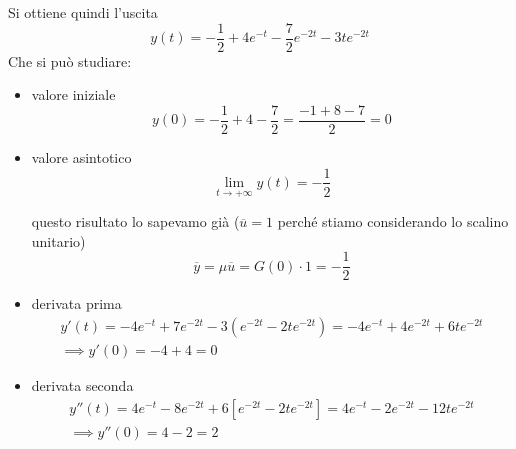 Si ottiene quindi l'uscita
\begin{equation*}
	y(t)=-\frac{1}{2} +4e^{-t} -\frac{7}{2} e^{-2t} -3te^{-2t}
\end{equation*}
Che si può studiare:
\begin{itemize}
	\item valore iniziale\begin{equation*}
	      y(0) =-\frac{1}{2} +4-\frac{7}{2} =\frac{-1+8-7}{2} =0
	\end{equation*}
	\item valore asintotico\begin{equation*}
	      \lim _{t\to +\infty } y(t) =-\frac{1}{2}
	\end{equation*}
	
	questo risultato lo sapevamo già ($\overline{u} =1$ perché stiamo considerando lo scalino unitario)\begin{equation*}
	\overline{y} =\mu \overline{u} =G(0) \cdotp 1=-\frac{1}{2}
	\end{equation*}
	\item derivata prima\begin{gather*}
	      y'(t) =-4e^{-t} +7e^{-2t} -3\left(e^{-2t} -2te^{-2t}\right) =-4e^{-t} +4e^{-2t} +6te^{-2t}\\
	      \implies y'(0) =-4+4=0
	\end{gather*}
	\item derivata seconda\begin{gather*}
	      y''(t) =4e^{-t} -8e^{-2t} +6\left[ e^{-2t} -2te^{-2t}\right] =4e^{-t} -2e^{-2t} -12te^{-2t}\\
	      \implies y''(0) =4-2=2
	\end{gather*}
\end{itemize}

